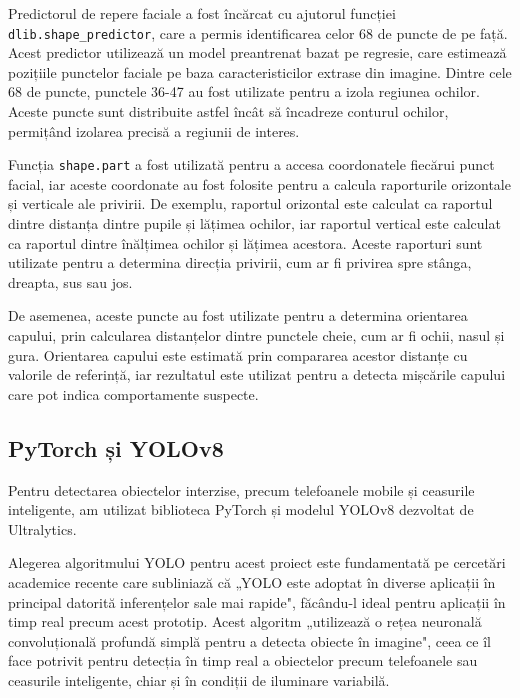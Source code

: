 \documentclass[12pt,a4paper]{article}
\begin{document}
Predictorul de repere faciale a fost încărcat cu ajutorul funcției \texttt{dlib.shape\_predictor}, care a permis identificarea celor 68 de puncte de pe față. Acest predictor utilizează un model preantrenat bazat pe regresie, care estimează pozițiile punctelor faciale pe baza caracteristicilor extrase din imagine. Dintre cele 68 de puncte, punctele 36-47 au fost utilizate pentru a izola regiunea ochilor. Aceste puncte sunt distribuite astfel încât să încadreze conturul ochilor, permițând izolarea precisă a regiunii de interes.

Funcția \texttt{shape.part} a fost utilizată pentru a accesa coordonatele fiecărui punct facial, iar aceste coordonate au fost folosite pentru a calcula raporturile orizontale și verticale ale privirii. De exemplu, raportul orizontal este calculat ca raportul dintre distanța dintre pupile și lățimea ochilor, iar raportul vertical este calculat ca raportul dintre înălțimea ochilor și lățimea acestora. Aceste raporturi sunt utilizate pentru a determina direcția privirii, cum ar fi privirea spre stânga, dreapta, sus sau jos.

De asemenea, aceste puncte au fost utilizate pentru a determina orientarea capului, prin calcularea distanțelor dintre punctele cheie, cum ar fi ochii, nasul și gura. Orientarea capului este estimată prin compararea acestor distanțe cu valorile de referință, iar rezultatul este utilizat pentru a detecta mișcările capului care pot indica comportamente suspecte.

\subsection{PyTorch și YOLOv8}
Pentru detectarea obiectelor interzise, precum telefoanele mobile și ceasurile inteligente, am utilizat biblioteca PyTorch\cite{pytorch} și modelul YOLOv8 dezvoltat de Ultralytics\cite{ultralytics}. 

Alegerea algoritmului YOLO pentru acest proiect este fundamentată pe cercetări academice recente care 
subliniază că „YOLO este adoptat în diverse aplicații în principal datorită inferențelor sale mai 
rapide"\cite{wang2022object}, făcându-l ideal pentru aplicații în timp real precum acest prototip. 
Acest algoritm „utilizează o rețea neuronală convoluțională profundă simplă pentru a detecta obiecte 
în imagine"\cite{v7labs2023yolo}, ceea ce îl face potrivit pentru detecția în timp real a obiectelor precum 
telefoanele sau ceasurile inteligente, chiar și în condiții de iluminare variabilă.
\end{document}
